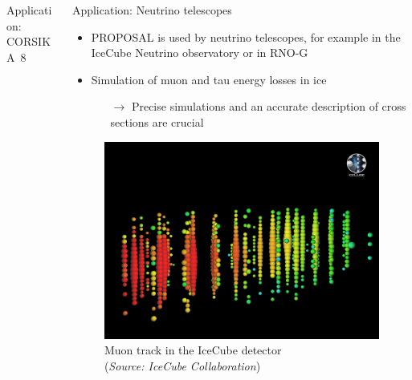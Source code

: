 \documentclass[t]{beamer}
\newlength{\thirdtextwidth}
\newlength{\itemseparation}
\begin{document}
\begin{columns}[onlytextwidth]
\begin{column}{\thirdtextwidth}
\begin{block}[equal height group=B]{Application: CORSIKA~8}

      \end{block}%
    \end{column}%
    \begin{column}{\thirdtextwidth}%
      \begin{block}[equal height group=B]{Application: Neutrino telescopes}%
        \begin{itemize}
          \setlength\itemsep{\itemseparation}
          \item PROPOSAL is used by neutrino telescopes, for example in the IceCube Neutrino observatory or in RNO-G
          \item Simulation of muon and tau energy losses in ice
          \begin{itemize}
            \setlength\itemsep{\itemseparation}
            \item[$\rightarrow$] Precise simulations and an accurate description of cross sections are crucial
          \end{itemize}
        \end{itemize}

        \vspace{1.75em}

        \begin{figure}
          \centering
          \includegraphics[width=0.7\linewidth, height=.4\textheight, keepaspectratio]{plots/icecube_muon.jpg}
          \caption*{Muon track in the IceCube detector \\(\emph{Source: IceCube Collaboration})}
        \end{figure}


\end{block}
\end{column}
\end{columns}
\end{document}

